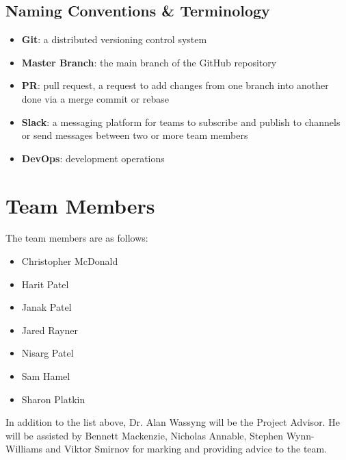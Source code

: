 \documentclass[11pt]{article}
\begin{document}
\subsection{Naming Conventions \& Terminology}
\begin{itemize}
\item \textbf{Git}: a distributed versioning control system
\item \textbf{Master Branch}: the main branch of the GitHub repository
\item \textbf{PR}: pull request, a request to add changes from one branch into another done via a merge commit or rebase
\item \textbf{Slack}: a messaging platform for teams to subscribe and publish to channels or send messages between two or more team members
\item \textbf{DevOps}: development operations
\end{itemize}

\section{Team Members}
The team members are as follows:
\begin{itemize}
\item Christopher McDonald
\item Harit Patel
\item Janak Patel
\item Jared Rayner
\item Nisarg Patel
\item Sam Hamel
\item Sharon Platkin
\end{itemize}
In addition to the list above, Dr. Alan Wassyng will be the Project Advisor. He will be assisted by Bennett Mackenzie, Nicholas Annable, Stephen Wynn-Williams and Viktor Smirnov for marking and providing advice to the team.
\end{document}
